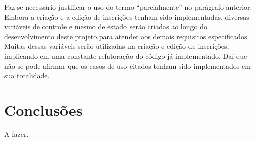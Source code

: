 \documentclass[
  10.5pt,				  %
	openright,			%
	twoside,			  %
  a5paper,
  chapter=TITLE,	%
	section=TITLE,	%
  hyphens,        %
	english,        %
	brazil          %
]{abntex2}
\begin{document}
\begin{table}[!htb]
\end{table}

Faz-se necessário justificar o uso do termo ``parcialmente'' no parágrafo anterior. Embora a criação e a edição de inscrições tenham sido implementadas, diversas variáveis de controle e mesmo de estado serão criadas ao longo do desenvolvimento deste projeto para atender aos demais requisitos especificados. Muitas dessas variáveis serão utilizadas na criação e edição de inscrições, implicando em uma constante refatoração do código já implementado. Daí que não se pode afirmar que os casos de uso citados tenham sido implementados em sua totalidade.




\chapter{Conclusões}
A fazer.




%
\end{document}
